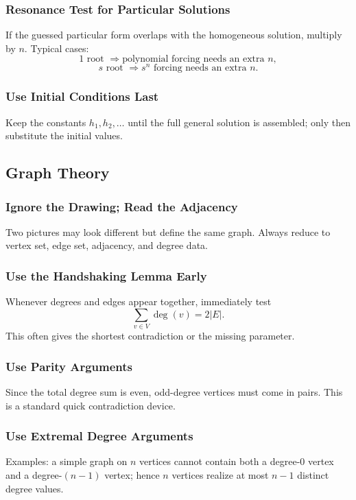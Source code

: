 \documentclass[12pt]{article}
\begin{document}
\subsubsection{Resonance Test for Particular Solutions}
If the guessed particular form overlaps with the homogeneous solution, multiply by \(n\).
Typical cases:
\[
1\text{ root } \Rightarrow \text{polynomial forcing needs an extra }n,
\]
\[
s\text{ root } \Rightarrow s^n\text{ forcing needs an extra }n.
\]

\subsubsection{Use Initial Conditions Last}
Keep the constants \(h_1,h_2,\dots\) until the full general solution is assembled; only then substitute the initial values.

\subsection{Graph Theory}

\subsubsection{Ignore the Drawing; Read the Adjacency}
Two pictures may look different but define the same graph.
Always reduce to vertex set, edge set, adjacency, and degree data.

\subsubsection{Use the Handshaking Lemma Early}
Whenever degrees and edges appear together, immediately test
\[
\sum_{v\in V}\deg(v)=2|E|.
\]
This often gives the shortest contradiction or the missing parameter.

\subsubsection{Use Parity Arguments}
Since the total degree sum is even, odd-degree vertices must come in pairs.
This is a standard quick contradiction device.

\subsubsection{Use Extremal Degree Arguments}
Examples:
a simple graph on \(n\) vertices cannot contain both a degree-\(0\) vertex and a degree-\((n-1)\) vertex;
hence \(n\) vertices realize at most \(n-1\) distinct degree values.
\end{document}
